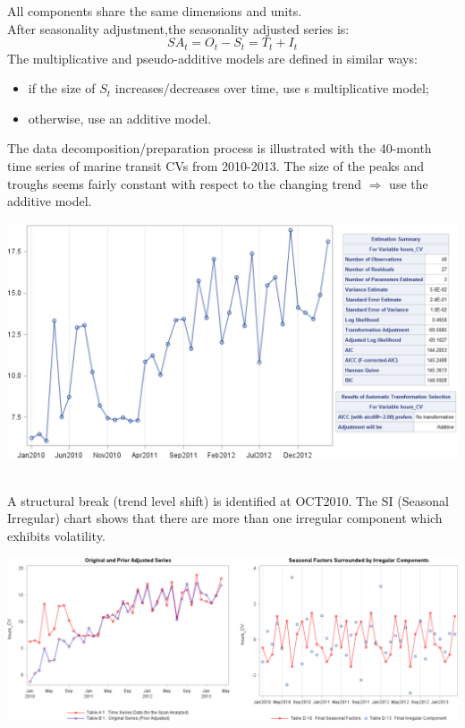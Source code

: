 \documentclass[20pt,landscape,footrule,headrule]{foils}
\newcommand{\newl}{\newline\newline}
\begin{document}
    All components share the same dimensions and units. \newpage\ \\ \noindent After seasonality adjustment,the seasonality adjusted series is:
    \begin{equation*}
        SA_t = O_t - S_t = T_t + I_t
    \end{equation*}
The multiplicative and pseudo-additive models are defined in similar ways:\begin{itemize} 
\item if the size of $S_t$   increases/decreases over time, use s multiplicative model; 
\item otherwise, use an additive model.
\end{itemize}
The data decomposition/preparation process is illustrated with the 40-month time series of marine transit CVs from 2010-2013. \newl The size of the peaks and troughs seems fairly constant with respect to the changing trend $\Longrightarrow$ use the additive model.
\newpage\ \begin{center}
\includegraphics[width=\textwidth]{Images/CV_continuously.png}
\end{center}\newpage \ \\ \noindent A structural break (trend level shift) is identified at OCT2010. \newl The SI (Seasonal Irregular) chart shows that there are more than one irregular component which exhibits volatility.
\begin{center}
\includegraphics[width=\textwidth]{Images/DiffComponents.png}
\end{center}
\end{document}
